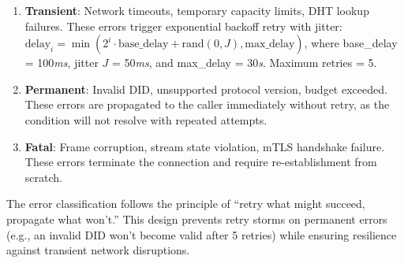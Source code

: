 \begin{enumerate}
  \item \textbf{Transient}: Network timeouts, temporary capacity limits, DHT lookup failures. These errors trigger exponential backoff retry with jitter: $\text{delay}_i = \min(2^i \cdot \text{base\_delay} + \text{rand}(0, J), \text{max\_delay})$, where base\_delay = 100\textit{ms}, jitter $J$ = 50\textit{ms}, and max\_delay = 30\textit{s}. Maximum retries = 5.

  \item \textbf{Permanent}: Invalid DID, unsupported protocol version, budget exceeded. These errors are propagated to the caller immediately without retry, as the condition will not resolve with repeated attempts.

  \item \textbf{Fatal}: Frame corruption, stream state violation, mTLS handshake failure. These errors terminate the connection and require re-establishment from scratch.
\end{enumerate}

The error classification follows the principle of ``retry what might succeed, propagate what won't.'' This design prevents retry storms on permanent errors (e.g., an invalid DID won't become valid after 5 retries) while ensuring resilience against transient network disruptions.